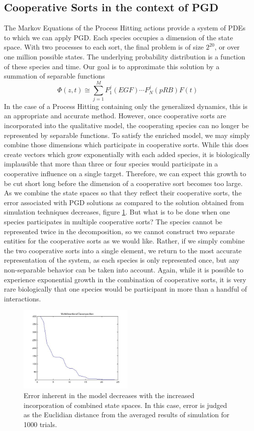 \documentclass{article}
\begin{document}
\subsection{Cooperative Sorts in the context of PGD}
The Markov Equations of the Process Hitting actions provide a system of PDEs to which we can apply PGD. Each species occupies a dimension of the state space. With two processes to each sort, the final problem is of size $2^{20}$, or over one million possible states. The underlying probability distribution is a function of these species and time. Our goal is to approximate this solution by a summation of separable functions 
\[
 \Phi(z,t)\cong \sum_{j=1}^{M}F_1^j(EGF)\cdots F_N^j(pRB) F(t)
\]
 In the case of a Process Hitting containing only the generalized dynamics, this is an appropriate and accurate method. However, once cooperative sorts are incorporated into the qualitative model, the cooperating species can no longer be represented by separable functions. To satisfy the enriched model, we may simply combine those dimensions which participate in cooperative sorts. While this does create vectors which grow exponentially with each added species, it is biologically implausible that more than three or four species would participate in a cooperative influence on a single target. Therefore, we can expect this growth to be cut short long before the dimension of a cooperative sort becomes too large. As we combine the state spaces so that they reflect their cooperative sorts, the error associated with PGD solutions as compared to the solution obtained from simulation techniques decreases, figure \ref{error_coop}. But what is to be done when one species participates in multiple cooperative sorts? The species cannot be represented twice in the decomposition, so we cannot construct two separate entities for the cooperative sorts as we would like. Rather, if we simply combine the two cooperative sorts into a single element, we return to the most accurate representation of the system, as each species is only represented once, but any non-separable behavior can be taken into account. Again, while it is possible to experience exponential growth in the combination of cooperative sorts, it is very rare biologically that one species would be participant in more than a handful of interactions.\\
 
\begin{figure}[h!]
\centering
 \includegraphics[width=0.5\textwidth]{singular_full.jpg}
 \caption{Error inherent in the model decreases with the increased incorporation of combined state spaces. In this case, error is judged as the Euclidian distance from the averaged results of simulation for 1000 trials.}
 \label{error_coop}
\end{figure}
\end{document}
